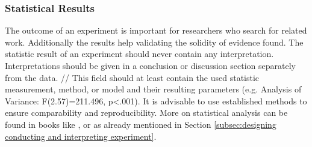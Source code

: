 \subsubsection{Statistical Results}
\label{statisticalresults}

The outcome of an experiment is important for researchers who search for related work. Additionally the results help validating the solidity of evidence found. The statistic result of an experiment should never contain any interpretation. Interpretations should be given in a conclusion or discussion section separately from the data. //
This field should at least contain the used statistic measurement, method, or model and their resulting parameters (e.g. Analysis of Variance: F(2.57)=211.496, p<.001). It is advisable to use established methods to ensure comparability and reproducibility. More on statistical analysis can be found in books like \cite{Wohlin2012}, or \cite{Albert2008} as already mentioned in Section \ref{subsec:designing conducting and interpreting experiment}.
